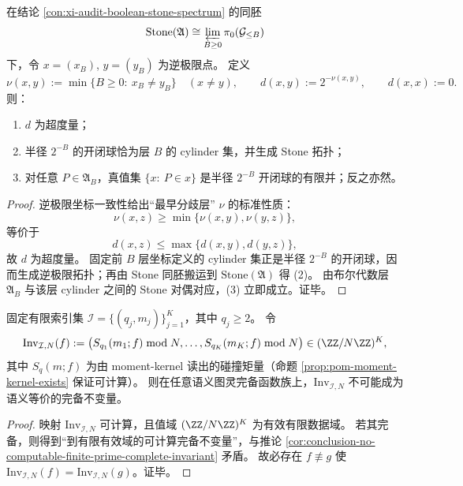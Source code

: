 \begin{proposition}\label{prop:conclusion-budget-filtration-stone-ultrametric}
在结论 \ref{con:xi-audit-boolean-stone-spectrum} 的同胚
\[
\mathrm{Stone}(\mathfrak A)\cong \varprojlim_{B\ge 0}\pi_0(\mathcal G_{\le B})
\]
下，令 \(x=(x_B)\), \(y=(y_B)\) 为逆极限点。
定义
\[
\nu(x,y):=\min\{B\ge 0:\ x_B\neq y_B\}\quad(x\neq y),\qquad
d(x,y):=2^{-\nu(x,y)},\qquad d(x,x):=0.
\]
则：
\begin{enumerate}
  \item \(d\) 为超度量；
  \item 半径 \(2^{-B}\) 的开闭球恰为层 \(B\) 的 cylinder 集，并生成 Stone 拓扑；
  \item 对任意 \(P\in \mathfrak A_B\)，真值集 \(\{x:\ P\in x\}\) 是半径 \(2^{-B}\) 开闭球的有限并；反之亦然。
\end{enumerate}
\end{proposition}
\begin{proof}
逆极限坐标一致性给出“最早分歧层” \(\nu\) 的标准性质：
\[
\nu(x,z)\ge \min\{\nu(x,y),\nu(y,z)\},
\]
等价于
\[
d(x,z)\le \max\{d(x,y),d(y,z)\},
\]
故 \(d\) 为超度量。
固定前 \(B\) 层坐标定义的 cylinder 集正是半径 \(2^{-B}\) 的开闭球，因而生成逆极限拓扑；再由 Stone 同胚搬运到 \(\mathrm{Stone}(\mathfrak A)\) 得 (2)。
由布尔代数层 \(\mathfrak A_B\) 与该层 cylinder 之间的 Stone 对偶对应，(3) 立即成立。证毕。
\end{proof}

\begin{theorem}\label{thm:conclusion-finite-spectral-moment-fingerprint-not-complete}
固定有限索引集 \(\mathcal I=\{(q_j,m_j)\}_{j=1}^{K}\)，其中 \(q_j\ge 2\)。
令
\[
\mathrm{Inv}_{\mathcal I,N}(f):=
\bigl(S_{q_1}(m_1;f)\bmod N,\dots,S_{q_K}(m_K;f)\bmod N\bigr)\in (\ZZ/N\ZZ)^K,
\]
其中 \(S_q(m;f)\) 为由 moment-kernel 读出的碰撞矩量（命题 \ref{prop:pom-moment-kernel-exists} 保证可计算）。
则在任意语义图灵完备函数族上，\(\mathrm{Inv}_{\mathcal I,N}\) 不可能成为语义等价的完备不变量。
\end{theorem}
\begin{proof}
映射 \(\mathrm{Inv}_{\mathcal I,N}\) 可计算，且值域 \((\ZZ/N\ZZ)^K\) 为有效有限数据域。
若其完备，则得到“到有限有效域的可计算完备不变量”，与推论 \ref{cor:conclusion-no-computable-finite-prime-complete-invariant} 矛盾。
故必存在 \(f\not\equiv g\) 使 \(\mathrm{Inv}_{\mathcal I,N}(f)=\mathrm{Inv}_{\mathcal I,N}(g)\)。证毕。
\end{proof}

